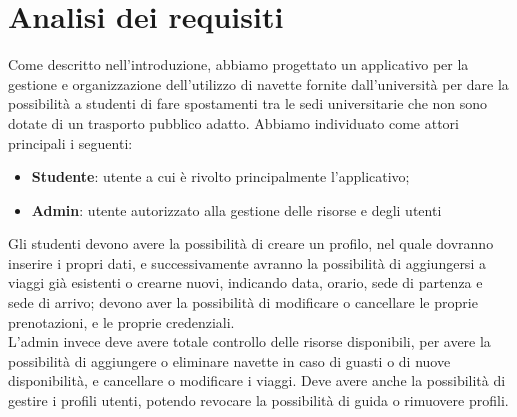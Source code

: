 \section{Analisi dei requisiti}
Come descritto nell'introduzione, abbiamo progettato un applicativo per la gestione e organizzazione dell'utilizzo di navette fornite dall'università per dare la possibilità a studenti di fare spostamenti tra le sedi universitarie che non sono dotate di un trasporto pubblico adatto.
Abbiamo individuato come attori principali i seguenti:
\begin{itemize}
    \item \textbf{Studente}: utente a cui è rivolto principalmente l'applicativo; 
    \item \textbf{Admin}:  utente autorizzato alla gestione delle risorse e degli utenti
\end{itemize}
Gli studenti devono avere la possibilità di creare un profilo, nel quale dovranno inserire i propri dati, e successivamente avranno la possibilità di aggiungersi a viaggi già esistenti o crearne nuovi, indicando data, orario, sede di partenza e sede di arrivo; devono aver la possibilità di modificare o cancellare le proprie prenotazioni, e le proprie credenziali.
\\L'admin invece deve avere totale controllo delle risorse disponibili, per avere la possibilità di aggiungere o eliminare navette in caso di guasti o di nuove disponibilità, e cancellare o modificare i viaggi. Deve avere anche la possibilità di gestire i profili utenti, potendo revocare la possibilità di guida o rimuovere profili.
